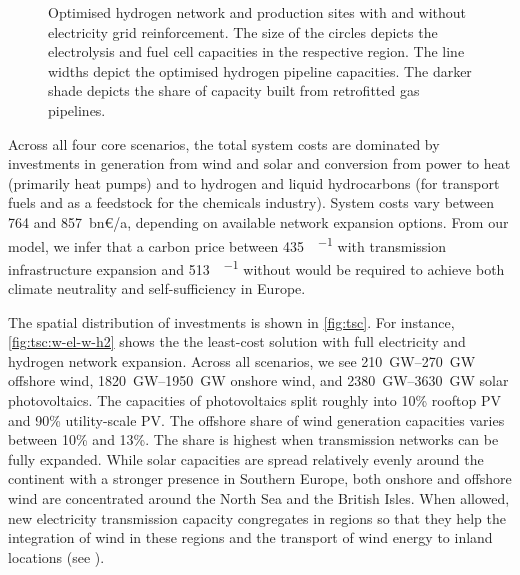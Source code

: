\begin{figure}
    \centering
     \caption{Optimised hydrogen network and production sites with and without
    electricity grid reinforcement. The size of the circles depicts the
    electrolysis and fuel cell capacities in the respective region. The line
    widths depict the optimised hydrogen pipeline capacities. The darker shade
    depicts the share of capacity built from retrofitted gas pipelines.}
    \label{fig:h2-network}
\end{figure}


Across all four core scenarios, the total system costs are dominated by
investments in generation from wind and solar and conversion from power to heat
(primarily heat pumps) and to hydrogen and liquid hydrocarbons (for transport
fuels and as a feedstock for the chemicals industry). System costs vary between
764 and 857~bn\euro/a, depending on available network expansion options. From
our model, we infer that a carbon price between \SI{435}{\sieuro\per\tco} with
transmission infrastructure expansion and \SI{513}{\sieuro\per\tco} without
would be required to achieve both climate neutrality and self-sufficiency in Europe.


The spatial distribution of investments is shown in \cref{fig:tsc}. For
instance, \cref{fig:tsc:w-el-w-h2} shows the the least-cost solution with full
electricity and hydrogen network expansion. Across all scenarios, we see
\SIrange{210}{270}{\giga\watt} offshore wind, \SIrange{1820}{1950}{\giga\watt}
onshore wind, and \SIrange{2380}{3630}{\giga\watt} solar photovoltaics. The
capacities of photovoltaics split roughly into 10\% rooftop PV and 90\%
utility-scale PV. The offshore share of wind generation capacities varies
between 10\% and 13\%. The share is highest when transmission networks can be
fully expanded. While solar capacities are spread relatively evenly around the
continent with a stronger presence in Southern Europe, both onshore and offshore
wind are concentrated around the North Sea and the British Isles. When allowed,
new electricity transmission capacity congregates in regions so that they help
the integration of wind in these regions and the transport of wind energy to
inland locations (see ).

